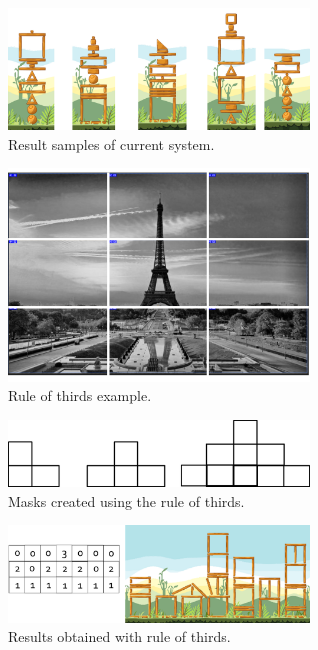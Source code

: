 \documentclass[conference]{IEEEtran}
\begin{document}
     \begin{figure}[htbp]
        \centerline{\includegraphics[width=80mm]{Images/result_example.png}}
        \caption{Result samples of current system.}
        \label{results_old}
    \end{figure}
    \begin{figure}[htbp]
        \centerline{\includegraphics[width=80mm]{Images/ruleofthirds_example.png}}
        \caption{Rule of thirds example.}
        \label{rule_of_thirds}
    \end{figure}
    \begin{figure}[htbp]
        \centerline{\includegraphics[width=80mm]{Images/mask_distribution.png}}
        \caption{Masks created using the rule of thirds.}
        \label{rule_of_thirds_masks}
    \end{figure}
    \begin{figure}[htbp]
        \centerline{\includegraphics[width=80mm]{Images/result_example_thirds.png}}
        \caption{Results obtained with rule of thirds.}
        \label{rule_of_thirds_result}
    \end{figure}
\end{document}
